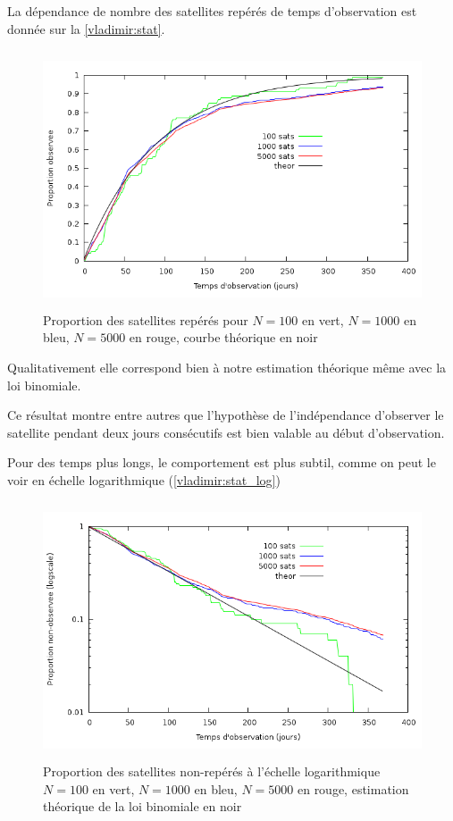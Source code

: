 La d\'ependance de nombre des satellites rep\'er\'es de temps d'observation
est donn\'ee sur la \autoref{vladimir:stat}. 
 \begin{figure}[htp] \centering
      \includegraphics*[height=3in]{stat.png}
      \caption{
            \label{vladimir:stat}
  Proportion des satellites rep\'er\'es pour  $N = 100$ en vert, $N = 1000$ en bleu, $N = 5000$ en rouge, courbe th\'eorique
  en noir}
 \end{figure}
Qualitativement elle correspond bien \`a notre estimation th\'eorique m\^eme avec la loi
binomiale.  

Ce r\'esultat montre entre autres que l'hypoth\`ese de l'ind\'ependance 
d'observer le satellite pendant deux jours cons\'ecutifs est 
bien valable au d\'ebut d'observation. 

Pour des temps plus longs, le comportement est plus subtil, comme on
peut le voir en échelle logarithmique (\autoref{vladimir:stat_log})

\begin{figure}[ht] \centering
      \includegraphics*[height=3in]{stat_log.png}
      \caption{
            \label{vladimir:stat_log}
  Proportion des satellites non-rep\'er\'es \`a l'\'echelle logarithmique $N = 100$ en vert, $N = 1000$ en bleu, $N = 5000$ en rouge, estimation th\'eorique
  de la loi binomiale en noir}
 \end{figure}

